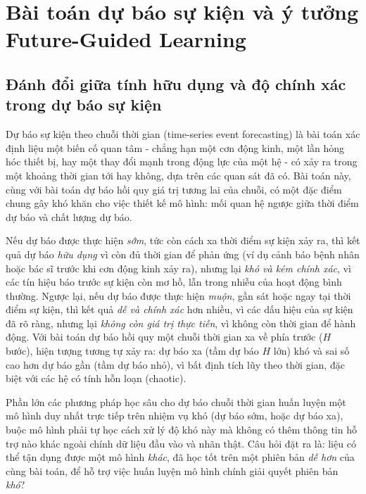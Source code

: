 \chapter{Bài toán dự báo sự kiện và ý tưởng Future-Guided Learning}
\label{chuong:baitoan}

\section{Đánh đổi giữa tính hữu dụng và độ chính xác trong dự báo sự kiện}

Dự báo sự kiện theo chuỗi thời gian (time-series event forecasting) là bài toán xác định
liệu một biến cố quan tâm - chẳng hạn một cơn động kinh, một lần hỏng hóc thiết bị, hay một
thay đổi mạnh trong động lực của một hệ - có xảy ra trong một khoảng thời gian tới hay
không, dựa trên các quan sát đã có. Bài toán này, cùng với bài toán dự báo hồi quy giá trị
tương lai của chuỗi, có một đặc điểm chung gây khó khăn cho việc thiết kế mô hình: mối quan hệ
ngược giữa thời điểm dự báo và chất lượng dự báo.

Nếu dự báo được thực hiện \textit{sớm}, tức còn cách xa thời điểm sự kiện xảy ra, thì kết quả
dự báo \textit{hữu dụng} vì còn đủ thời gian để phản ứng (ví dụ cảnh báo bệnh nhân hoặc bác sĩ
trước khi cơn động kinh xảy ra), nhưng lại \textit{khó và kém chính xác}, vì các tín hiệu báo
trước sự kiện còn mơ hồ, lẫn trong nhiễu của hoạt động bình thường. Ngược lại, nếu dự báo được
thực hiện \textit{muộn}, gần sát hoặc ngay tại thời điểm sự kiện, thì kết quả \textit{dễ và
chính xác} hơn nhiều, vì các dấu hiệu của sự kiện đã rõ ràng, nhưng lại \textit{không còn giá
trị thực tiễn}, vì không còn thời gian để hành động. Với bài toán dự báo hồi quy một chuỗi
thời gian xa về phía trước ($H$ bước), hiện tượng tương tự xảy ra: dự báo xa (tầm dự báo $H$
lớn) khó và sai số cao hơn dự báo gần (tầm dự báo nhỏ), vì bất định tích lũy theo thời gian,
đặc biệt với các hệ có tính hỗn loạn (chaotic).

Phần lớn các phương pháp học sâu cho dự báo chuỗi thời gian huấn luyện một mô hình duy nhất
trực tiếp trên nhiệm vụ khó (dự báo sớm, hoặc dự báo xa), buộc mô hình phải tự học cách xử lý
độ khó này mà không có thêm thông tin hỗ trợ nào khác ngoài chính dữ liệu đầu vào và nhãn thật.
Câu hỏi đặt ra là: liệu có thể tận dụng được một mô hình \textit{khác}, đã học tốt trên một
phiên bản \textit{dễ hơn} của cùng bài toán, để hỗ trợ việc huấn luyện mô hình chính giải
quyết phiên bản \textit{khó}?

